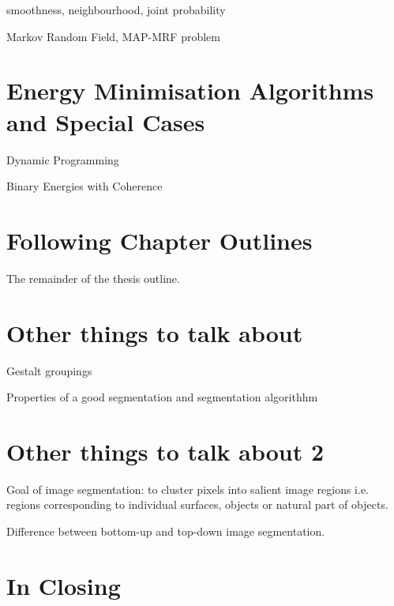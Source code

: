 smoothness, neighbourhood, joint probability

Markov Random Field, MAP-MRF problem


\section{Energy Minimisation Algorithms and Special Cases}\label{FillingFile}

Dynamic Programming 

Binary Energies with Coherence


\section{Following Chapter Outlines}

The remainder of the thesis outline.


\section{Other things to talk about}\label{ThesisConventions}

Gestalt groupings

Properties of a good segmentation and segmentation algorithhm


\section{Other things to talk about 2}

Goal of image segmentation: to cluster pixels into salient image regions i.e. regions corresponding to individual surfaces, objects or natural part of objects.

Difference between bottom-up and top-down image segmentation.


\section{In Closing}

